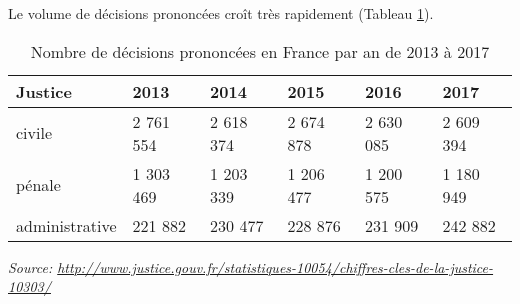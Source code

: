  Le volume de décisions prononcées croît très rapidement (Tableau \ref{tab:intro:nbdecisionstats}). 
 
 \begin{table}[!htb]
 	\small
 	\begin{center}
 		\begin{tabular}{|l|l|l|l|l|l|}
 			\hline
 			\textbf{Justice}	& \textbf{2013}      & \textbf{2014}      & \textbf{2015}      & \textbf{2016}      & \textbf{2017}      \\ \hline
 			civile         & 2 761 554 & 2 618 374 & 2 674 878 & 2 630 085 & 2 609 394 \\ \hline
 			pénale         & 1 303 469 & 1 203 339 & 1 206 477 & 1 200 575 & 1 180 949 \\ \hline
 			administrative & 221 882   & 230 477   & 228 876   & 231 909   & 242 882   \\ \hline
 		\end{tabular}
 		
 		\textit{\scriptsize{Source: \url{http://www.justice.gouv.fr/statistiques-10054/chiffres-cles-de-la-justice-10303/}}}  
 	\end{center}
 	\caption{Nombre de décisions prononcées en France par an de 2013 à 2017}\label{tab:intro:nbdecisionstats}
 \end{table}
 
